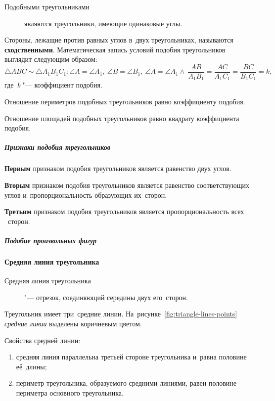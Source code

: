 \documentclass[]{scrartcl}
\begin{document}
\begin{description}
	\item[Подобными треугольниками] являются треугольники, имеющие одинаковые углы. 
\end{description}  
Стороны, лежащие против равных углов в~двух треугольниках, называются \textbf{сходственными}. Математическая запись условий подобия треугольников выглядит следующим образом:
\begin{equation}\label{key}
\triangle ABC \sim \triangle A_{1}B_{1}C_{1}: \angle A = \angle A_{1},\ \angle B = \angle B_{1},\ \angle A = \angle A_{1} \wedge \ \frac{AB}{A_{1}B_{1}}=\frac{AC}{A_{1}C_{1}}=\frac{BC}{B_{1}C_{1}}=k,
\end{equation}
где~\textit{k} "--- коэффициент подобия.

Отношение периметров подобных треугольников равно коэффициенту подобия.

Отношение площадей подобных треугольников равно квадрату коэффициента подобия.

\subparagraph{Признаки подобия треугольников}\label{similarity-of-triangles-signs}

\textbf{Первым} признаком подобия треугольников является равенство двух углов.

\textbf{Вторым} признаком подобия треугольников является равенство соответствующих углов и~пропорциональность образующих их~сторон.

\textbf{Третьим} признаком подобия треугольников является пропорциональность всех ~сторон.

\subparagraph{Подобие произвольных фигур}

\paragraph{Средняя линия треугольника}
\begin{description}
	\item[Средняя линия треугольника] "--- отрезок, соединяющий середины двух его~сторон.
\end{description}
Треугольник имеет три~средние линии. На~рисунке~\ref{fig:triangle-lines-points} \emph{средние линии} выделены коричневым цветом.

Свойства средней линии:
\begin{enumerate}
	\item средняя линия параллельна третьей стороне треугольника и~равна половине её~длины;
	\item периметр треугольника, образуемого средними линиями, равен половине периметра основного треугольника.
\end{enumerate}
\end{document}
